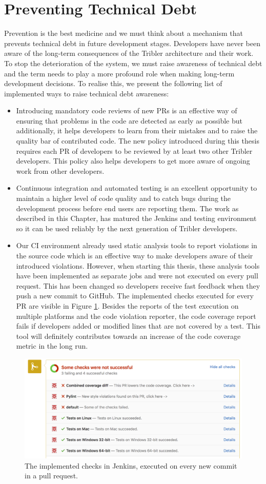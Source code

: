 \section{Preventing Technical Debt}
Prevention is the best medicine and we must think about a mechanism that prevents technical debt in future development stages. Developers have never been aware of the long-term consequences of the Tribler architecture and their work. To stop the deterioration of the system, we must raise awareness of technical debt and the term needs to play a more profound role when making long-term development decisions. To realise this, we present the following list of implemented ways to raise technical debt awareness:
\begin{itemize}
	\item Introducing mandatory code reviews of new PRs is an effective way of ensuring that problems in the code are detected as early as possible\cite{18fpreventdebt} but additionally, it helps developers to learn from their mistakes and to raise the quality bar of contributed code. The new policy introduced during this thesis requires each PR of developers to be reviewed by at least two other Tribler developers. This policy also helps developers to get more aware of ongoing work from other developers.
	\item Continuous integration and automated testing is an excellent opportunity to maintain a higher level of code quality and to catch bugs during the development process before end users are reporting them. The work as described in this Chapter, has matured the Jenkins and testing environment so it can be used reliably by the next generation of Tribler developers.
	\item Our CI environment already used static analysis tools to report violations in the source code which is an effective way to make developers aware of their introduced violations\cite{nagappan2005static}. However, when starting this thesis, these analysis tools have been implemented as separate jobs and were not executed on every pull request. This has been changed so developers receive fast feedback when they push a new commit to GitHub. The implemented checks executed for every PR are visible in Figure \ref{fig:jenkins-check}. Besides the reports of the test execution on multiple platforms and the code violation reporter, the code coverage report fails if developers added or modified lines that are not covered by a test. This tool will definitely contributes towards an increase of the code coverage metric in the long run.
\end{itemize}

\begin{figure}[h!]
	\centering
	\includegraphics[width=1.0\columnwidth]{images/improving_qa/jenkins_checks}
	\caption{The implemented checks in Jenkins, executed on every new commit in a pull request.}
	\label{fig:jenkins-check}
\end{figure}